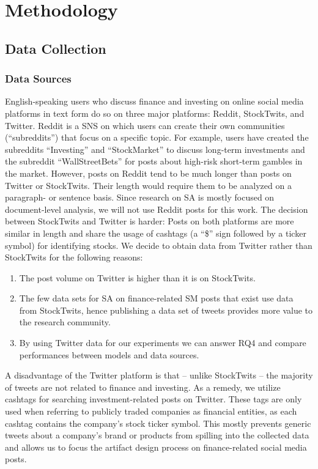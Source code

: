 \section{Methodology}
\subsection{Data Collection}
\subsubsection{Data Sources}
English-speaking users who discuss finance and investing on online social media platforms in text form do so on three major platforms: Reddit, StockTwits, and Twitter. Reddit is a SNS on which users can create their own communities (``subreddits'') that focus on a specific topic. For example, users have created the subreddits ``Investing'' and ``StockMarket'' to discuss long-term investments and the subreddit ``WallStreetBets'' for posts about high-risk short-term gambles in the market. However, posts on Reddit tend to be much longer than posts on Twitter or StockTwits. Their length would require them to be analyzed on a paragraph- or sentence basis. Since research on SA is mostly focused on document-level analysis, we will not use Reddit posts for this work. The decision between StockTwits and Twitter is harder: Posts on both platforms are more similar in length and share the usage of cashtags (a ``\$'' sign followed by a ticker symbol) for identifying stocks. We decide to obtain data from Twitter rather than StockTwits for the following reasons:
\begin{enumerate}[noitemsep]
	\item The post volume on Twitter is higher than it is on StockTwits.
	\item The few data sets for SA on finance-related SM posts that exist use data from StockTwits, hence publishing a data set of tweets provides more value to the research community.
	\item By using Twitter data for our experiments we can answer RQ4 and compare performances between models and data sources.
\end{enumerate}

A disadvantage of the Twitter platform is that -- unlike StockTwits -- the majority of tweets are not related to finance and investing. As a remedy, we utilize cashtags for searching investment-related posts on Twitter. These tags are only used when referring to publicly traded companies as financial entities, as each cashtag contains the company's stock ticker symbol. This mostly prevents generic tweets about a company's brand or products from spilling into the collected data and allows us to focus the artifact design process on finance-related social media posts.

